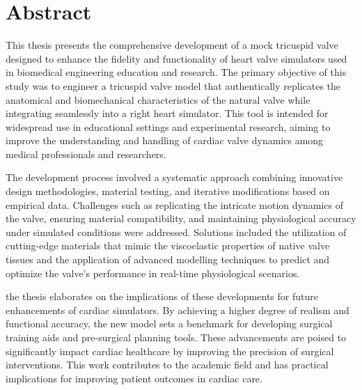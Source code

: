\chapter*{Abstract}




{\LARGE This thesis} presents the comprehensive development of a mock tricuspid valve designed to enhance the fidelity and functionality of heart valve simulators used in biomedical engineering education and research. The primary objective of this study was to engineer a tricuspid valve model that authentically replicates the anatomical and biomechanical characteristics of the natural valve while integrating seamlessly into a right heart simulator. This tool is intended for widespread use in educational settings and experimental research, aiming to improve the understanding and handling of cardiac valve dynamics among medical professionals and researchers.

The development process involved a systematic approach combining innovative design methodologies, material testing, and iterative modifications based on empirical data. Challenges such as replicating the intricate motion dynamics of the valve, ensuring material compatibility, and maintaining physiological accuracy under simulated conditions were addressed. Solutions included the utilization of cutting-edge materials that mimic the viscoelastic properties of native valve tissues and the application of advanced modelling techniques to predict and optimize the valve's performance in real-time physiological scenarios.

 the thesis elaborates on the implications of these developments for future enhancements of cardiac simulators. By achieving a higher degree of realism and functional accuracy, the new model sets a benchmark for developing surgical training aids and pre-surgical planning tools. These advancements are poised to significantly impact cardiac healthcare by improving the precision of surgical interventions. This work contributes to the academic field and has practical implications for improving patient outcomes in cardiac care.